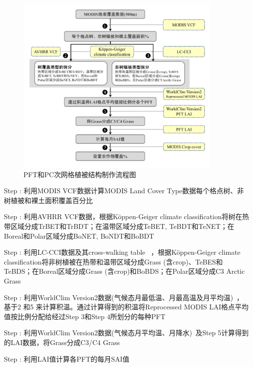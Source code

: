 {
\begin{figure}[htbp]
\centering
\includegraphics[width=0.9\textwidth]{Figures/尺度转换/PFT和PC植被结构制作流程图.png}
\caption{PFT和PC次网格植被结构制作流程图}
\label{fig:植被结构制作流程图}
\end{figure}
}

 Step : 利用MODIS VCF数据计算MODIS Land Cover Type数据每个格点树、非树植被和裸土面积覆盖百分比

Step : 利用AVHRR VCF数据，根据Köppen-Geiger climate classification将树在热带区域分成TrBET和TrBDT；在温带区域分成TeBET, TeBDT和TeNET；在Boreal和Polar区域分成BoNET, BoNDT和BoBDT

Step : 利用LC-CCI数据及其cross-walking table ~\citep{poulter2015PlantFunctionalType}，根据Köppen-Geiger climate classification将非树植被在热带和温带区域分成Grass (含crop)、TeBES和TeBDS；在Boreal区域分成Grass (含crop)和BoBDS；在Polar区域分成C3 Arctic Grass

Step : 利用WorldClim Version2数据(气候态月最低温、月最高温及月平均温)~\citep{fick2017worldclim}，基于2 \textcelsius 和5 \textcelsius 来计算积温。通过计算得到的积温将Reprocessed MODIS LAI格点平均值按比例分配给经过Step 3和Step 4所划分的每种PFT

Step : 利用WorldClim Version2数据(气候态月平均温、月降水)~\citep{fick2017worldclim}及Step 5计算得到的LAI数据，将Grass分成C3/C4 Grass ~\citep{still2003GlobalDistributionC3}

Step : 利用LAI值计算各PFT的每月SAI值~\citep{lawrence2007representing,zeng2002coupling}


